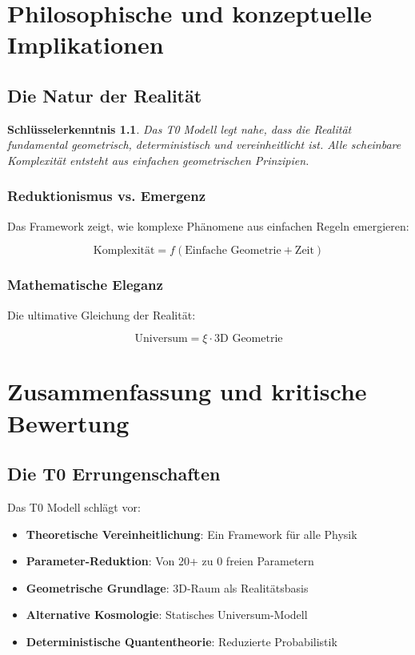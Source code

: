 \documentclass[12pt,a4paper]{report}
\newtheorem{erkenntnis}{Schlüsselerkenntnis}[chapter]
\begin{document}
	\chapter{Philosophische und konzeptuelle Implikationen}
	
	\section{Die Natur der Realität}
	
	\begin{erkenntnis}
		Das T0 Modell legt nahe, dass die Realität fundamental geometrisch, deterministisch und vereinheitlicht ist. Alle scheinbare Komplexität entsteht aus einfachen geometrischen Prinzipien.
	\end{erkenntnis}
	
	\subsection{Reduktionismus vs. Emergenz}
	
	Das Framework zeigt, wie komplexe Phänomene aus einfachen Regeln emergieren:
	
	\begin{equation}
		\text{Komplexität} = f(\text{Einfache Geometrie} + \text{Zeit})
	\end{equation}
	
	\subsection{Mathematische Eleganz}
	
	Die ultimative Gleichung der Realität:
	
	\begin{equation}
		\boxed{\text{Universum} = \xi \cdot \text{3D Geometrie}}
	\end{equation}
	
	\chapter{Zusammenfassung und kritische Bewertung}
	
	\section{Die T0 Errungenschaften}
	
	Das T0 Modell schlägt vor:
	
	\begin{itemize}
		\item \textbf{Theoretische Vereinheitlichung}: Ein Framework für alle Physik
		\item \textbf{Parameter-Reduktion}: Von 20+ zu 0 freien Parametern
		\item \textbf{Geometrische Grundlage}: 3D-Raum als Realitätsbasis
		\item \textbf{Alternative Kosmologie}: Statisches Universum-Modell
		\item \textbf{Deterministische Quantentheorie}: Reduzierte Probabilistik
	\end{itemize}
	
\end{document}

